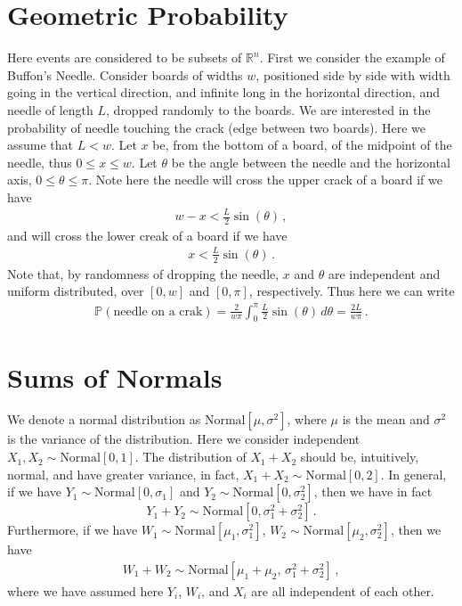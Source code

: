 \documentclass[11pt, onesided]{book}
\theoremstyle{break}
\theoremstyle{break}
\newcommand{\R}{\mathbb{R}}
\begin{document}
\section[Geometric Probability]{\color{red} Geometric Probability \color{black}}
Here events are considered to be subsets of $\R^n$. First we consider the example of Buffon's Needle. Consider boards of widths $w$, positioned side by side with width going in the vertical direction, and infinite long in the horizontal direction, and needle of length $L$, dropped randomly to the boards. We are interested in the probability of needle touching the crack (edge between two boards). Here we assume that $L<w$. Let $x$ be, from the bottom of a board, of the midpoint of the needle, thus $0\leq x \leq w$. Let $\theta$ be the angle between the needle and the horizontal axis, $0\leq \theta \leq \pi$. Note here the needle will cross the upper crack of a board if we have
\begin{align*}
w-x < \frac{L}{2}\sin(\theta)\,,
\end{align*}
and will cross the lower creak of a board if we have
\begin{align*}
x < \frac{L}{2}\sin(\theta)\,.
\end{align*}
Note that, by randomness of dropping the needle, $x$ and $\theta$ are independent and uniform distributed, over $[0,w]$ and $[0,\pi]$, respectively. Thus here we can write
\begin{align*}
\mathbb{P}(\text{needle on a crak}) = \frac{2}{w\pi}\int_0^\pi \frac{L}{2}\sin(\theta) \, d\theta = \frac{2L}{w\pi}\,.
\end{align*}


\section[Sums of Normals]{\color{red} Sums of Normals\color{black}}
We denote a normal distribution as $\text{Normal}[\mu,\sigma^2]$, where $\mu$ is the mean and $\sigma^2$ is the variance of the distribution. Here we consider independent $X_1,X_2\sim \text{Normal}[0,1]$. The distribution of $X_1+X_2$ should be, intuitively, normal, and have greater variance, in fact, $X_1 + X_2 \sim \text{Normal}[0,2]$. In general, if we have $Y_1 \sim \text{Normal}[0,\sigma_1]$ and $Y_2 \sim \text{Normal}[0,\sigma_2^2]$, then we have in fact
$$Y_1 + Y_2 \sim \text{Normal}[0, \sigma_1^2 + \sigma_2^2]\,.$$
Furthermore, if we have $W_1 \sim \text{Normal}[\mu_1, \sigma_1^2]$, $W_2\sim \text{Normal}[\mu_2, \sigma_2^2]$, then we have
\begin{align*}
W_1 + W_2 \sim \text{Normal}[\mu_1+\mu_2,\, \sigma_1^2 + \sigma_2^2]\,, \tag{*}
\end{align*}
where we have assumed here $Y_i$, $W_i$, and $X_i$ are all independent of each other. 
\end{document}
